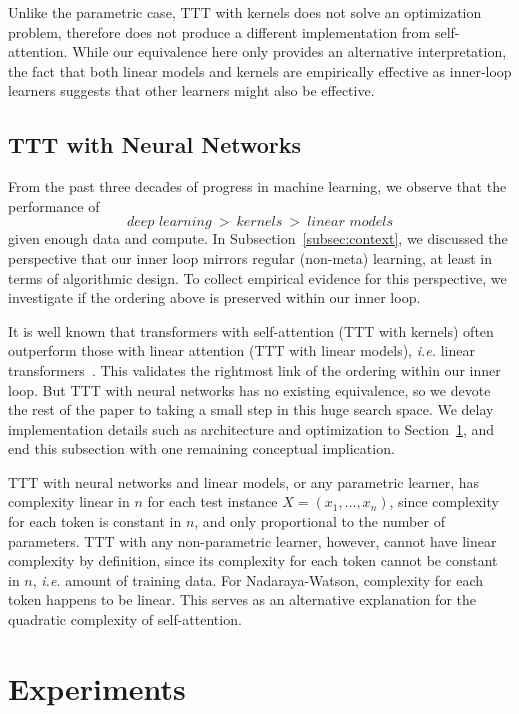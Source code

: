 \documentclass{article}
\begin{document}
Unlike the parametric case, TTT with kernels does not solve an optimization problem, therefore does not produce a different implementation from self-attention.
While our equivalence here only provides an alternative interpretation, the fact that both linear models and kernels are empirically effective as inner-loop learners suggests that other learners might also be effective.

\subsection{TTT with Neural Networks}
\label{subsec:neuralnetwork}
From the past three decades of progress in machine learning, we observe that the performance of 
\begin{equation*}
\label{eq:ineq}
\textit{deep~learning} ~>~ \textit{kernels} ~>~ \textit{linear models}
\end{equation*}
given enough data and compute.
In Subsection~\ref{subsec:context}, we discussed the perspective that our inner loop mirrors regular (non-meta) learning, at least in terms of algorithmic design.
To collect empirical evidence for this perspective, we investigate if the ordering above is preserved within our inner loop.

It is well known that transformers with self-attention (TTT with kernels) often outperform those with linear attention (TTT with linear models), \textit{i.e.} linear transformers~\citep{katharopoulos2020transformers}. 
This validates the rightmost link of the ordering within our inner loop.
But TTT with neural networks has no existing equivalence, so we devote the rest of the paper to taking a small step in this huge search space. 
We delay implementation details such as architecture and optimization to Section~\ref{sec:exp}, and end this subsection with one remaining conceptual implication.

TTT with neural networks and linear models, or any parametric learner, has complexity linear in $n$ for each test instance $X = (x_1,\dots,x_n)$, since complexity for each token is constant in $n$, and only proportional to the number of parameters.
TTT with any non-parametric learner, however, cannot have linear complexity by definition, since its complexity for each token cannot be constant in $n$, \textit{i.e.} amount of training data.
For Nadaraya-Watson, complexity for each token happens to be linear.
This serves as an alternative explanation for the quadratic complexity of self-attention. 

\section{Experiments}
\label{sec:exp}
\end{document}
